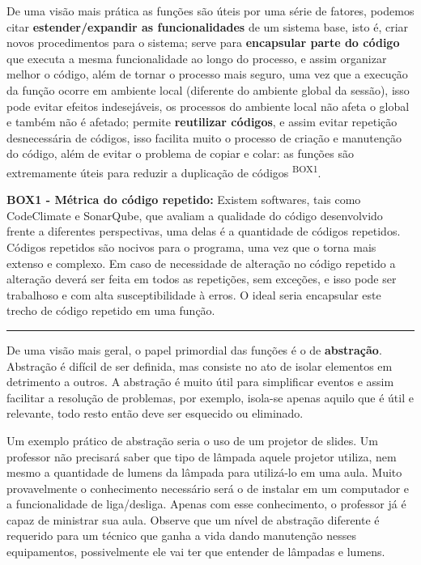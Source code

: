 \documentclass[
  11pt,
  a5paper,
  openany]{book}
\begin{document}
De uma visão mais prática as funções são úteis por uma série de fatores, podemos citar \textbf{estender/expandir as funcionalidades} de um sistema base, isto é, criar novos procedimentos para o sistema; serve para \textbf{encapsular parte do código} que executa a mesma funcionalidade ao longo do processo, e assim organizar melhor o código, além de tornar o processo mais seguro, uma vez que a execução da função ocorre em ambiente local (diferente do ambiente global da sessão), isso pode evitar efeitos indesejáveis, os processos do ambiente local não afeta o global e também não é afetado; permite \textbf{reutilizar códigos}, e assim evitar repetição desnecessária de códigos, isso facilita muito o processo de criação e manutenção do código, além de evitar o problema de copiar e colar: as funções são extremamente úteis para reduzir a duplicação de códigos \textsuperscript{BOX1}.

\textbf{BOX1 - Métrica do código repetido:}
Existem softwares, tais como CodeClimate e SonarQube, que avaliam a qualidade do código desenvolvido frente a diferentes perspectivas, uma delas é a quantidade de códigos repetidos. Códigos repetidos são nocivos para o programa, uma vez que o torna mais extenso e complexo. Em caso de necessidade de alteração no código repetido a alteração deverá ser feita em todos as repetições, sem exceções, e isso pode ser trabalhoso e com alta susceptibilidade à erros. O ideal seria encapsular este trecho de código repetido em uma função.

\begin{center}\rule{0.5\linewidth}{0.5pt}\end{center}

De uma visão mais geral, o papel primordial das funções é o de \textbf{abstração}. Abstração é difícil de ser definida, mas consiste no ato de isolar elementos em detrimento a outros. A abstração é muito útil para simplificar eventos e assim facilitar a resolução de problemas, por exemplo, isola-se apenas aquilo que é útil e relevante, todo resto então deve ser esquecido ou eliminado.

Um exemplo prático de abstração seria o uso de um projetor de slides. Um professor não precisará saber que tipo de lâmpada aquele projetor utiliza, nem mesmo a quantidade de lumens da lâmpada para utilizá-lo em uma aula. Muito provavelmente o conhecimento necessário será o de instalar em um computador e a funcionalidade de liga/desliga. Apenas com esse conhecimento, o professor já é capaz de ministrar sua aula. Observe que um nível de abstração diferente é requerido para um técnico que ganha a vida dando manutenção nesses equipamentos, possivelmente ele vai ter que entender de lâmpadas e lumens.
\end{document}
